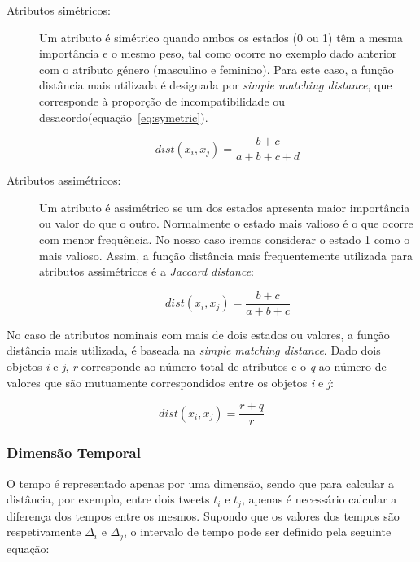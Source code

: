 \begin{description}
\item[Atributos simétricos: ] Um atributo é simétrico quando ambos os estados (0 ou 1) têm a mesma importância e o mesmo peso, tal como ocorre no exemplo dado anterior com o atributo género (masculino e feminino). Para este caso, a função distância mais utilizada é designada por \textit{simple matching distance}, que corresponde à proporção de incompatibilidade ou desacordo(equação~\ref{eq:symetric}).  

\begin{equation}
 dist(x_{i}, x_{j}) =  \frac{b + c}{a + b + c + d}
 \label{eq:symetric}   
\end{equation}

\item[Atributos assimétricos: ] Um atributo é assimétrico se um dos estados apresenta maior importância ou valor do que o outro. Normalmente o estado mais valioso é o que ocorre com menor frequência. No nosso caso iremos considerar o estado 1 como o mais valioso. Assim, a função distância mais frequentemente utilizada para atributos assimétricos é a \textit{Jaccard distance}:

\begin{equation}
 dist(x_{i}, x_{j}) =  \frac{b + c}{a + b + c}
\label{eq:asymetric}   
\end{equation}

\end{description}

No caso de atributos nominais com mais de dois estados ou valores, a função distância mais utilizada, é baseada na \textit{simple matching distance}. Dado dois objetos \textit{i} e \textit{j}, \textit{r} corresponde ao número total de atributos e o \textit{q} ao número de valores que são mutuamente correspondidos entre os objetos \textit{i} e \textit{j}:

\begin{equation}
 dist(x_{i}, x_{j}) =  \frac{r + q}{r}
\end{equation}

\subsubsection{Dimensão Temporal}

O tempo é representado apenas por uma dimensão, sendo que para calcular a distância, por exemplo, entre dois tweets $ t_{i} $ e $ t_{j} $, apenas é necessário calcular a diferença dos tempos entre os mesmos. Supondo que os valores dos tempos são respetivamente $ \Delta_{i} $ e $ \Delta_{j} $, o intervalo de tempo pode ser definido pela seguinte equação:

